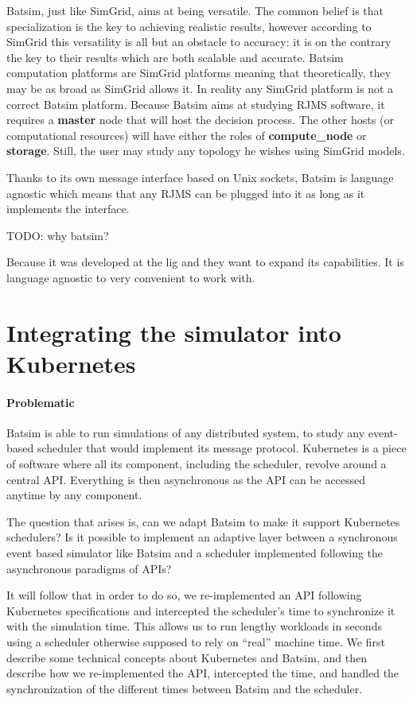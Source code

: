 \documentclass[12pt, a4paper]{memoir}
\begin{document}
Batsim, just like SimGrid, aims at being versatile. The common belief is that
specialization is the key to achieving realistic results, however according to
SimGrid this versatility is all but an obstacle to
accuracy\cite{casanova:hal-01017319}: it is on the contrary the key to their
results which are both scalable and accurate. Batsim computation platforms are
SimGrid platforms meaning that theoretically, they may be as broad as SimGrid
allows it. In reality any SimGrid platform is not a correct Batsim platform.
Because Batsim aims at studying RJMS software, it requires a \textbf{master}
node that will host the decision process. The other hosts (or computational
resources) will have either the roles of \textbf{compute\_node} or
\textbf{storage}. Still, the user may study any topology he wishes using
SimGrid models.

Thanks to its own message interface based on Unix sockets, Batsim is language
agnostic which means that any RJMS can be plugged into it as long as it
implements the interface.

TODO: why batsim?

Because it was developed at the lig and they want to expand its capabilities.
It is language agnostic to very convenient to work with.

\chapter{Integrating the simulator into Kubernetes}

\subsubsection{Problematic}

Batsim is able to run simulations of any distributed system, to study any
event-based scheduler that would implement its message protocol. Kubernetes is
a piece of software where all its component, including the scheduler, revolve
around a central API. Everything is then asynchronous as the API can be
accessed anytime by any component.

The question that arises is, can we adapt Batsim to make it support Kubernetes
schedulers? Is it possible to implement an adaptive layer between a synchronous
event based simulator like Batsim and a scheduler implemented following the
asynchronous paradigms of APIs?

It will follow that in order to do so, we re-implemented an API following
Kubernetes specifications and intercepted the scheduler's time to
synchronize it with the simulation time. This allows us to run lengthy
workloads in seconds using a scheduler otherwise supposed to rely on ``real''
machine time. We first describe some technical concepts about Kubernetes and
Batsim, and then describe how we re-implemented the API, intercepted the time,
and handled the synchronization of the different times between Batsim and the
scheduler.
\end{document}
